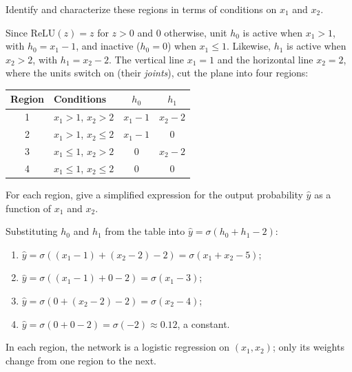 \documentclass[11pt, a4paper]{exam}
\newcommand{\ReLU}{\mathrm{ReLU}}
\begin{document}
\begin{exercises}
\begin{parts}
    \begin{subparts}
        \subpart Identify and characterize these regions in terms of conditions on $x_1$ and $x_2$.

        \begin{solution}
            Since $\ReLU(z) = z$ for $z > 0$ and $0$ otherwise, unit $h_0$ is active when $x_1 > 1$, with $h_0 = x_1 - 1$, and inactive ($h_0 = 0$) when $x_1 \leq 1$. Likewise, $h_1$ is active when $x_2 > 2$, with $h_1 = x_2 - 2$. The vertical line $x_1 = 1$ and the horizontal line $x_2 = 2$, where the units switch on (their \emph{joints}), cut the plane into four regions:
            \begin{center}
                \begin{tabular}{clcc}
                    \toprule
                    Region & Conditions & $h_0$ & $h_1$ \\
                    \midrule
                    1 & $x_1 > 1$, $x_2 > 2$ & $x_1 - 1$ & $x_2 - 2$ \\
                    2 & $x_1 > 1$, $x_2 \leq 2$ & $x_1 - 1$ & $0$ \\
                    3 & $x_1 \leq 1$, $x_2 > 2$ & $0$ & $x_2 - 2$ \\
                    4 & $x_1 \leq 1$, $x_2 \leq 2$ & $0$ & $0$ \\
                    \bottomrule
                \end{tabular}
            \end{center}
        \end{solution}

        \subpart For each region, give a simplified expression for the output probability $\hat{y}$ as a function of $x_1$ and $x_2$.

        \begin{solution}
            Substituting $h_0$ and $h_1$ from the table into $\hat{y} = \sigma(h_0 + h_1 - 2)$:
            \begin{enumerate}
                \item $\hat{y} = \sigma((x_1 - 1) + (x_2 - 2) - 2) = \sigma(x_1 + x_2 - 5)$;
                \item $\hat{y} = \sigma((x_1 - 1) + 0 - 2) = \sigma(x_1 - 3)$;
                \item $\hat{y} = \sigma(0 + (x_2 - 2) - 2) = \sigma(x_2 - 4)$;
                \item $\hat{y} = \sigma(0 + 0 - 2) = \sigma(-2) \approx 0.12$, a constant.
            \end{enumerate}
            In each region, the network is a logistic regression on $(x_1, x_2)$; only its weights change from one region to the next.
        \end{solution}
    \end{subparts}


\end{parts}
\end{exercises}
\end{document}
